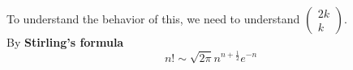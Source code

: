To understand the behavior of this, we need to understand $ \begin{pmatrix} 2k \\k \end{pmatrix} $. \\

By \textbf{Stirling's formula}
\[
  n! \sim \sqrt{2 \pi} n^{n + \frac{1}{2}} e^{-n}
\]



















